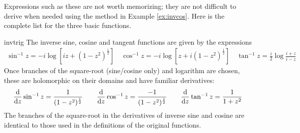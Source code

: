 \goodbreak


Expressions such as these are not worth memorizing; they are not difficult to derive when needed using the method in Example \ref{ex:invcos}. Here is the complete list for the three basic functions.


\begin{thm}{}{invtrig}
	The inverse sine, cosine and tangent functions are given by the expressions
	\begin{gather*}
		\sin^{-1}z = -i\log\left[iz+(1-z^2)^{\frac 12}\right] \quad
		\cos^{-1}z=-i\log\left[z+i(1-z^2)^{\frac 12}\right] \quad
		\tan^{-1}z=\frac i2\log\frac{i+z}{i-z}
	\end{gather*}
	Once branches of the square-root (sine/cosine only) and logarithm are chosen, these are holomorphic on their domains and have familiar derivatives:
	\[
		\frac{\mathrm{d} }{\mathrm{d} z}\sin^{-1}z=\frac 1{(1-z^2)^{\frac 12}}\qquad \frac{\mathrm{d} }{\mathrm{d} z}\cos^{-1}z=\frac{-1}{(1-z^2)^{\frac 12}}\qquad \frac{\mathrm{d} }{\mathrm{d} z}\tan^{-1}z=\frac 1{1+z^2}
	\]
	The branches of the square-root in the derivatives of inverse sine and cosine are identical to those used in the definitions of the original functions.
\end{thm}



